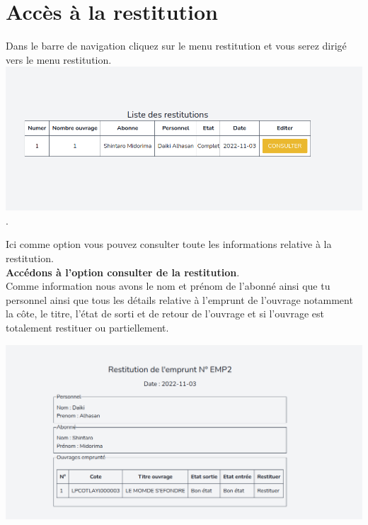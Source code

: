 \documentclass[12pt,a4paper]{article}
\begin{document}
\section{Accès à la restitution}
Dans le barre de navigation cliquez sur le menu restitution et vous serez dirigé vers le menu restitution.\\

\includegraphics[scale=0.5]{images/ListeDesRestitutions.png}.

Ici comme option vous pouvez consulter toute les informations relative à la restitution.\\
\textbf{Accédons à l'option consulter de la restitution}.\\

Comme information nous avons le nom et prénom de l'abonné ainsi que tu personnel ainsi que tous les détails relative à l'emprunt de l'ouvrage notamment la côte, le titre, l'état de sorti et de retour de l'ouvrage et si l'ouvrage est totalement restituer ou partiellement.

\includegraphics[scale=0.5]{images/showRestitution.png}
\end{document}
